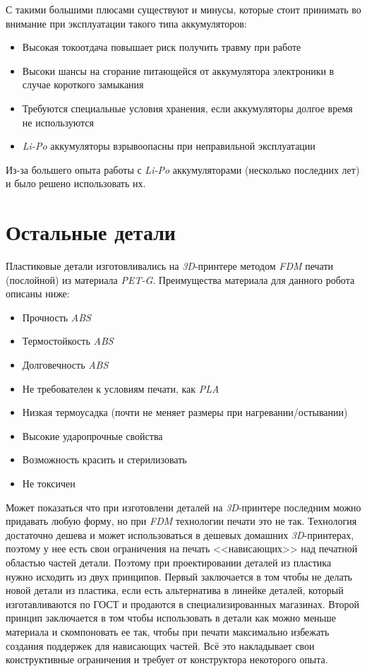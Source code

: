 С такими большими плюсами существуют и минусы, которые стоит принимать во внимание при эксплуатации такого типа аккумуляторов:
\begin{itemize}
    \item Высокая токоотдача повышает риск получить травму при работе
    \item Высоки шансы на сгорание питающейся от аккумулятора электроники в случае короткого замыкания
    \item Требуются специальные условия хранения, если аккумуляторы долгое время не используются
    \item \textit{Li-Po} аккумуляторы взрывоопасны при неправильной эксплуатации
\end{itemize}

Из-за большего опыта работы с \textit{Li-Po} аккумуляторами (несколько последних лет) и было решено использовать их. 



\section{Остальные детали}
Пластиковые детали изготовливались на \textit{3D}-принтере методом \textit{FDM} печати (послойной) из материала \textit{PET-G}. Преимущества материала для данного робота описаны ниже:
\begin{itemize}
    \item Прочность \textit{ABS}
    \item Термостойкость \textit{ABS}
    \item Долговечность \textit{ABS}
    \item Не требователен к условиям печати, как \textit{PLA}
    \item Низкая термоусадка (почти не меняет размеры при нагревании/остывании)
    \item Высокие ударопрочные свойства
    \item Возможность красить и стерилизовать
    \item Не токсичен
\end{itemize}

Может показаться что при изготовлени деталей на \textit{3D}-принтере последним можно придавать любую форму, но при \textit{FDM} технологии печати это не так. Технология достаточно дешева и может использоваться в дешевых домашних \textit{3D}-принтерах, поэтому у нее есть свои ограничения на печать <<нависающих>> над печатной областью частей детали. Поэтому при проектировании деталей из пластика нужно исходить из двух принципов. Первый заключается в том чтобы не делать новой детали из пластика, если есть альтернатива в линейке деталей, который изготавливаются по ГОСТ и продаются в специализированных магазинах. Второй принцип заключается в том чтобы использовать в детали как можно меньше материала и скомпоновать ее так, чтобы при печати максимально избежать создания поддержек для нависающих частей. Всё это накладывает свои конструктивные ограничения и требует от конструктора некоторого опыта.

